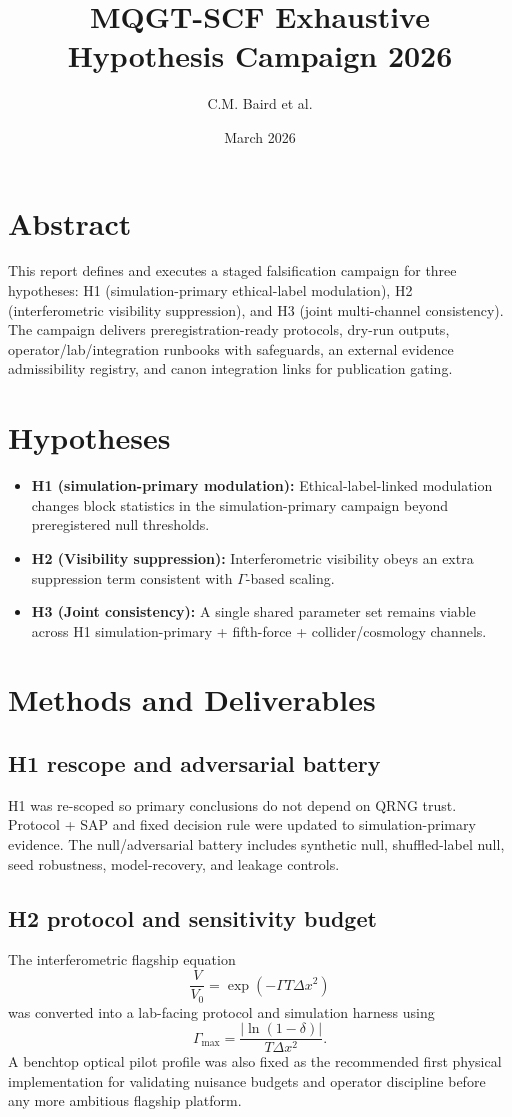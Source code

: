 \documentclass[11pt]{article}
\title{MQGT-SCF Exhaustive Hypothesis Campaign 2026}
\author{C.M. Baird et al.}
\date{March 2026}
\begin{document}
\maketitle

\section*{Abstract}
This report defines and executes a staged falsification campaign for three hypotheses: H1 (simulation-primary ethical-label modulation), H2 (interferometric visibility suppression), and H3 (joint multi-channel consistency). The campaign delivers preregistration-ready protocols, dry-run outputs, operator/lab/integration runbooks with safeguards, an external evidence admissibility registry, and canon integration links for publication gating.

\section{Hypotheses}
\begin{itemize}
    \item \textbf{H1 (simulation-primary modulation):} Ethical-label-linked modulation changes block statistics in the simulation-primary campaign beyond preregistered null thresholds.
    \item \textbf{H2 (Visibility suppression):} Interferometric visibility obeys an extra suppression term consistent with $\Gamma$-based scaling.
    \item \textbf{H3 (Joint consistency):} A single shared parameter set remains viable across H1 simulation-primary + fifth-force + collider/cosmology channels.
\end{itemize}

\section{Methods and Deliverables}
\subsection{H1 rescope and adversarial battery}
H1 was re-scoped so primary conclusions do not depend on QRNG trust. Protocol + SAP and fixed decision rule were updated to simulation-primary evidence. The null/adversarial battery includes synthetic null, shuffled-label null, seed robustness, model-recovery, and leakage controls.

\subsection{H2 protocol and sensitivity budget}
The interferometric flagship equation
\[
\frac{V}{V_0} = \exp(-\Gamma T \Delta x^2)
\]
was converted into a lab-facing protocol and simulation harness using
\[
\Gamma_{\max} = \frac{|\ln(1-\delta)|}{T\Delta x^2}.
\]
A benchtop optical pilot profile was also fixed as the recommended first physical implementation for validating nuisance budgets and operator discipline before any more ambitious flagship platform.
\end{document}
